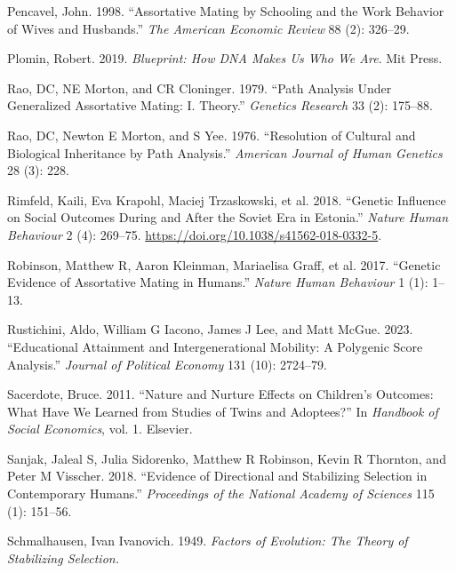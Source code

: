 \documentclass[
  12pt,
]{article}
\newlength{\cslhangindent}
\newenvironment{CSLReferences}[2] %
 {\begin{list}{}{%
  \setlength{\itemindent}{0pt}
  \setlength{\leftmargin}{0pt}
  \setlength{\parsep}{0pt}
  \ifodd #1
   \setlength{\leftmargin}{\cslhangindent}
   \setlength{\itemindent}{-1\cslhangindent}
  \fi
  \setlength{\itemsep}{#2\baselineskip}}}
 {\end{list}}
\theoremstyle{definition}
\theoremstyle{definition}
\theoremstyle{definition}
\theoremstyle{definition}
\theoremstyle{remark}
\begin{document}
\begin{CSLReferences}{1}{1}
Pencavel, John. 1998. {``Assortative Mating by Schooling and the Work Behavior of Wives and Husbands.''} \emph{The American Economic Review} 88 (2): 326--29.

Plomin, Robert. 2019. \emph{Blueprint: How DNA Makes Us Who We Are}. Mit Press.

Rao, DC, NE Morton, and CR Cloninger. 1979. {``Path Analysis Under Generalized Assortative Mating: I. Theory.''} \emph{Genetics Research} 33 (2): 175--88.

Rao, DC, Newton E Morton, and S Yee. 1976. {``Resolution of Cultural and Biological Inheritance by Path Analysis.''} \emph{American Journal of Human Genetics} 28 (3): 228.

Rimfeld, Kaili, Eva Krapohl, Maciej Trzaskowski, et al. 2018. {``Genetic Influence on Social Outcomes During and After the Soviet Era in Estonia.''} \emph{Nature Human Behaviour} 2 (4): 269--75. \url{https://doi.org/10.1038/s41562-018-0332-5}.

{Robinson, Matthew R, Aaron Kleinman, Mariaelisa Graff, et al.} 2017. {``Genetic Evidence of Assortative Mating in Humans.''} \emph{Nature Human Behaviour} 1 (1): 1--13.

Rustichini, Aldo, William G Iacono, James J Lee, and Matt McGue. 2023. {``Educational Attainment and Intergenerational Mobility: A Polygenic Score Analysis.''} \emph{Journal of Political Economy} 131 (10): 2724--79.

Sacerdote, Bruce. 2011. {``Nature and Nurture Effects on Children's Outcomes: What Have We Learned from Studies of Twins and Adoptees?''} In \emph{Handbook of Social Economics}, vol. 1. Elsevier.

Sanjak, Jaleal S, Julia Sidorenko, Matthew R Robinson, Kevin R Thornton, and Peter M Visscher. 2018. {``Evidence of Directional and Stabilizing Selection in Contemporary Humans.''} \emph{Proceedings of the National Academy of Sciences} 115 (1): 151--56.

Schmalhausen, Ivan Ivanovich. 1949. \emph{Factors of Evolution: The Theory of Stabilizing Selection.}


\end{CSLReferences}
\end{document}
